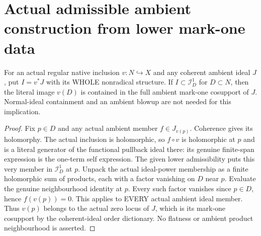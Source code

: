 \section{Actual admissible ambient construction from lower mark-one data}

\begin{theorem}
\label{hir:disjoint-native-mark-one-source-cosupport}
\leanok
For an actual regular native inclusion $v:N\hookrightarrow X$ and any coherent
ambient ideal $J$, put $I=v^*J$ with its WHOLE nonradical structure. If
$I\subset\mathcal I_D^1$ for $D\subset N$, then the literal image $v(D)$ is
contained in the full ambient mark-one cosupport of $J$. Normal-ideal
containment and an ambient blowup are not needed for this implication.
\end{theorem}
\begin{proof}
Fix $p\in D$ and any actual ambient member $f\in J_{v(p)}$. Coherence gives
its holomorphy. The actual inclusion is holomorphic, so $f\circ v$ is
holomorphic at $p$ and is a literal generator of the functional pullback
ideal there: its genuine finite-span expression is the one-term self
expression. The given lower admissibility puts this very member in
$\mathcal I_D^1$ at $p$. Unpack the actual ideal-power membership as a finite
holomorphic sum of products, each with a factor vanishing on $D$ near $p$.
Evaluate the genuine neighbourhood identity at $p$. Every such factor
vanishes since $p\in D$, hence $f(v(p))=0$. This applies to EVERY actual
ambient ideal member. Thus $v(p)$ belongs to the actual zero locus of $J$,
which is its mark-one cosupport by the coherent-ideal order dictionary.
No flatness or ambient product neighbourhood is asserted.
\end{proof}

